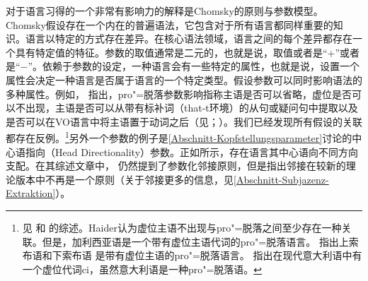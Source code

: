 对于语言习得的一个非常有影响力的解释是Chomsky的原则与参数模型\citeyearpar{Chomsky81a}。Chomsky假设存在一个内在的普遍语法，它包含对于所有语言都同样重要的知识。语言以特定的方式存在差异。在核心语法领域，语言之间的每个差异都存在一个具有特定值的特征。参数的取值通常是二元的，也就是说，取值或者是“+”或者是“$-$”。依赖于参数的设定，一种语言会有一些特定的属性，也就是说，设置一个属性会决定一种语言是否属于语言的一个特定类型。假设参数可以同时影响语法的多种属性\citep[]{Chomsky81a}。例如， \citet{Rizzi86a}指出，pro"=脱落参数影响指称主语是否可以省略，虚位是否可以不出现，主语是否可以从带有标补词（that-t环境）的从句或疑问句中提取以及是否可以在VO语言中将主语置于动词之后（见\citealp[\S~4.3]{Chomsky81a}；\citealp[]{Meisel95a}）。我们已经发现所有假设的关联都存在反例。\footnote{%
\label{fn-Expletiva-Pro-Drop}%
见 和 的综述。Haider认为虚位主语不出现与pro"=脱落之间至少存在一种关联。但是，加利西亚语是一个带有虚位主语代词的pro"=脱落语言\citep[\S~2.5]{RU90a-u}。 \citet[]{Franks95a-u}指出上索布语和下索布语 是带有虚位主语的pro"=脱落语言。 \citet[]{SP2002b}指出在现代意大利语中有一个虚位代词ci，虽然意大利语是一种pro"=脱落语。  
}另外一个参数的例子是\ref{Abschnitt-Kopfstellungsparameter}讨论的中心语指向（Head Directionality）参数。正如所示，存在语言其中心语向不同方向支配。在其综述文章中， \citet{Haider2001a}仍然提到了参数化邻接原则，但是指出邻接在较新的理论版本中不再是一个原则（关于邻接更多的信息，见\ref{Abschnitt-Subjazenz-Extraktion}）。
